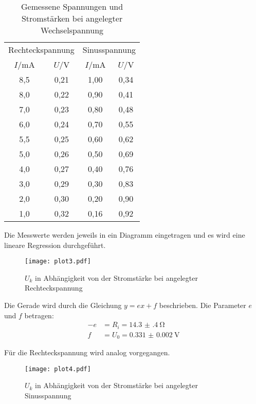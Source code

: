 \begin{table}[H]
  \centering
  \caption{Gemessene Spannungen und Stromstärken bei angelegter Wechselspannung}
  \label{tab:wechselspannung}
  \begin{tabular}{c c c c}
    \toprule
    \multicolumn{2}{c}{Rechteckspannung} & \multicolumn{2}{c}{Sinusspannung} \\
    \cmidrule(lr){1-2}\cmidrule(lr){3-4}
    $I/$mA & $U/$V & $I/$mA & $U/$V \\
    \midrule
    8,5  &  0,21  &  1,00  &   0,34 \\
    8,0  &  0,22  &  0,90  &   0,41 \\
    7,0  &  0,23  &  0,80  &   0,48 \\
    6,0  &  0,24  &  0,70  &   0,55 \\
    5,5  &  0,25  &  0,60  &   0,62 \\
    5,0  &  0,26  &  0,50  &   0,69 \\
    4,0  &  0,27  &  0,40  &   0,76 \\
    3,0  &  0,29  &  0,30  &   0,83 \\
    2,0  &  0,30  &  0,20  &   0,90 \\
    1,0  &  0,32  &  0,16  &   0,92 \\
    \bottomrule
  \end{tabular}
\end{table}

Die Messwerte werden jeweils in ein Diagramm eingetragen und es wird eine lineare Regression durchgeführt.

\begin{figure}[H]
  \centering
  \texttt{[image: plot3.pdf]}
  \caption{$U_k$ in Abhängigkeit von der Stromstärke bei angelegter Rechteckspannung}
  \label{fig:plot3}
\end{figure}

Die Gerade wird durch die Gleichung $y = ex + f$ beschrieben. Die Parameter $e$ und $f$ betragen:
\begin{align*}
  -e &= R_i = \SI{14.3(4)}{\ohm} \\
  f &= U_0 = \SI{0.331(2)}{\volt}
\end{align*}

Für die Rechteckspannung wird analog vorgegangen.

\begin{figure}[H]
  \centering
  \texttt{[image: plot4.pdf]}
  \caption{$U_k$ in Abhängigkeit von der Stromstärke bei angelegter Sinusspannung}
  \label{fig:plot4}
\end{figure}

